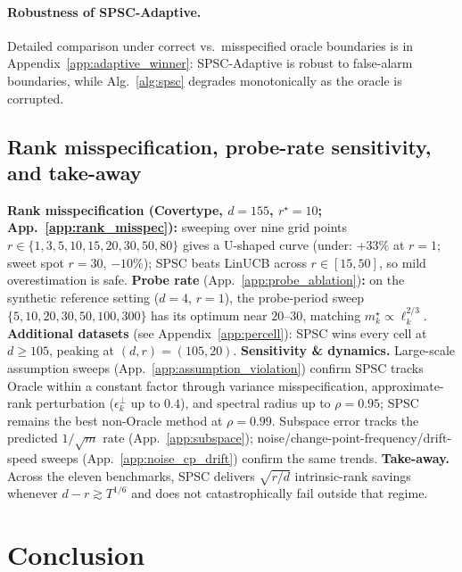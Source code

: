 \documentclass{article}
\begin{document}
\paragraph{Robustness of SPSC-Adaptive.} Detailed comparison under
correct vs.\ misspecified oracle boundaries is in
Appendix~\ref{app:adaptive_winner}: SPSC-Adaptive is robust to
false-alarm boundaries, while Alg.~\ref{alg:spsc} degrades
monotonically as the oracle is corrupted.

\subsection{Rank misspecification, probe-rate sensitivity, and take-away}
\label{sec:exp_sensitivity}

\textbf{Rank misspecification (Covertype, $d{=}155$, $r^\star{=}10$;
App.~\ref{app:rank_misspec}):} sweeping over nine grid points
$r\in\{1,3,5,10,15,20,30,50,80\}$ gives a U-shaped curve (under:
$+33\%$ at $r{=}1$; sweet spot $r{=}30$, $-10\%$); SPSC beats LinUCB
across $r\in[15,50]$, so mild overestimation is safe.
\textbf{Probe rate} (App.~\ref{app:probe_ablation})\textbf{:} on the
synthetic reference setting ($d{=}4$, $r{=}1$), the probe-period
sweep $\{5,10,20,30,50,100,300\}$ has its optimum near $20$--$30$,
matching $m_k^\star\propto \ell_k^{2/3}$.
\textbf{Additional datasets} (see
Appendix~\ref{app:percell}): SPSC wins every cell at $d\ge 105$,
peaking at $(d,r){=}(105,20)$.
\textbf{Sensitivity \& dynamics.} Large-scale assumption sweeps
(App.~\ref{app:assumption_violation}) confirm SPSC tracks Oracle
within a constant factor through variance misspecification,
approximate-rank perturbation ($\epsilon_k^\perp$ up to $0.4$), and
spectral radius up to $\rho{=}0.95$; SPSC remains the best non-Oracle
method at $\rho{=}0.99$. Subspace error tracks the predicted
$1/\sqrt m$ rate (App.~\ref{app:subspace});
noise/change-point-frequency/drift-speed sweeps
(App.~\ref{app:noise_cp_drift}) confirm the same trends.
\textbf{Take-away.} Across the eleven benchmarks, SPSC delivers
$\sqrt{r/d}$ intrinsic-rank savings whenever $d-r\gtrsim T^{1/6}$
and does not catastrophically fail outside that regime.

\section{Conclusion}
\label{sec:conclusion}
\end{document}
